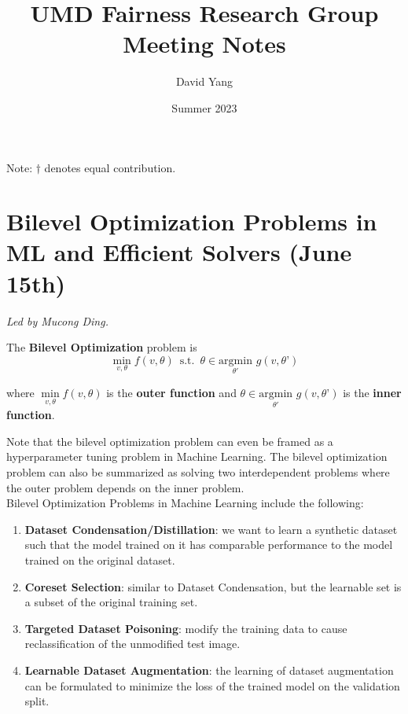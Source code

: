 \documentclass[12pt]{amsart}
\title{UMD Fairness Research Group Meeting Notes}
\author{David Yang}
\date{Summer 2023}
\begin{document}
\maketitle

\begin{center}
    Note: $\dagger$ denotes equal contribution.
\end{center}

\section{Bilevel Optimization Problems in ML and Efficient Solvers (June 15th)}

\textit{Led by Mucong Ding.} \\

\begin{definition}
The \textbf{Bilevel Optimization} problem is 
\[\min_{v, \theta} f(v, \theta) \, \text{   s.t.  } \, \theta \in \underset{\theta'}{\mathrm{argmin}} \, \, g(v, \theta’)\]

\noindent where $\underset{v, \theta}\min f(v, \theta)$ is the \textbf{outer function} and $\theta \in \underset{\theta'}{\mathrm{argmin}} \, \, g(v, \theta’)$ is the \textbf{inner function}.
\end{definition}

Note that the bilevel optimization problem can even be framed as a hyperparameter tuning problem in Machine Learning. The bilevel optimization problem can also be summarized as solving two interdependent problems where the outer problem depends on the inner problem. \\

Bilevel Optimization Problems in Machine Learning include the following:
\begin{enumerate}
    \item \textbf{Dataset Condensation/Distillation}: we want to learn a synthetic dataset such that the model trained on it has comparable performance to the model trained on the original dataset.
    \item \textbf{Coreset Selection}: similar to Dataset Condensation, but the learnable set is a subset of the original training set.
    \item \textbf{Targeted Dataset Poisoning}: modify the training data to cause reclassification of the unmodified test image.
    \item \textbf{Learnable Dataset Augmentation}: the learning of dataset augmentation can be formulated to minimize the loss of the trained model on the validation split.
\end{enumerate}
\end{document}
